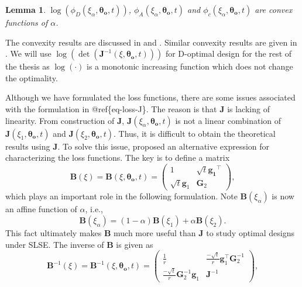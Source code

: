 \documentclass[
]{book}
\newtheorem{lemma}{Lemma}[chapter]
\theoremstyle{definition}
\theoremstyle{definition}
\theoremstyle{definition}
\theoremstyle{definition}
\theoremstyle{remark}
\begin{document}
\begin{lemma}
\(\log(\phi_D(\xi_{\alpha},\boldsymbol{\theta_o},t))\), \(\phi_A(\xi_{\alpha},\boldsymbol{\theta_o},t)\) and \(\phi_c(\xi_{\alpha},\boldsymbol{\theta_o},t)\) are convex functions of \(\alpha\).
\end{lemma}

The convexity results are discussed in \citet{boyd2004convex} and \citet{wong2019cvx}. Similar convexity results are given in \citet{bose2015optimal}. We will use \(\log(\det(\boldsymbol{J}^{-1}(\xi,\boldsymbol{\theta_o},t)))\) for D-optimal design for the rest of the thesis as \(\log(\cdot)\) is a monotonic increasing function which does not change the optimality.

Although we have formulated the loss functions, there are some issues associated with the formulation in @ref\{eq-loss-J\}. The reason is that \(\boldsymbol{J}\) is lacking of linearity. From construction of \(\boldsymbol{J}\), \(\boldsymbol{J}(\xi_{\alpha},\boldsymbol{\theta_o},t)\) is not a linear combination of \(\boldsymbol{J}(\xi_{1},\boldsymbol{\theta_o},t)\) and \(\boldsymbol{J}(\xi_{2},\boldsymbol{\theta_o},t)\). Thus, it is difficult to obtain the theoretical results using \(\boldsymbol{J}\). To solve this issue, \citet{gao2017d} proposed an alternative expression for characterizing the loss functions. The key is to define a matrix
\begin{equation}
\boldsymbol{B}(\xi)=\boldsymbol{B}(\xi,\boldsymbol{\theta_o},t)=
\begin{pmatrix}
1               &   \sqrt{t}\boldsymbol{g_1}^\top\\
\sqrt{t}\boldsymbol{g}_1    &   \boldsymbol{G}_2
\end{pmatrix},
 \label{eq:B-matrix}
\end{equation}
which plays an important role in the following formulation. Note \(\boldsymbol{B}(\xi_{\alpha})\) is now an affine function of \(\alpha\), i.e.,
\[ \boldsymbol{B}(\xi_{\alpha})=(1-\alpha)\boldsymbol{B}(\xi_1)+\alpha\boldsymbol{B}(\xi_2).\]
This fact ultimately makes \(\boldsymbol{B}\) much more useful than \(\boldsymbol{J}\) to study optimal designs under SLSE. The inverse of \(\boldsymbol{B}\) is given as
\begin{equation}
\boldsymbol{B}^{-1}(\xi)=\boldsymbol{B}^{-1}(\xi,\boldsymbol{\theta_o},t)   =\begin{pmatrix}
\frac{1}{r}             &   \frac{-\sqrt{t}}{r}\boldsymbol{g}_1^\top\boldsymbol{G}_2^{-1}   \\
\frac{-\sqrt{t}}{r}\boldsymbol{G}_2^{-1}\boldsymbol{g}_1    &\boldsymbol{J}^{-1}
\end{pmatrix},
 \label{eq:B-inverse}
\end{equation}
\end{document}
